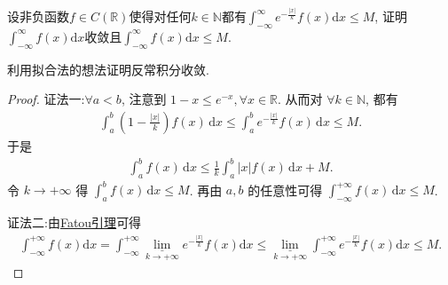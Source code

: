 \documentclass[../../main.tex]{subfiles}
\begin{document}
\begin{example}
设非负函数$f \in C(\mathbb{R})$使得对任何$k \in \mathbb{N}$都有$\int_{-\infty}^{\infty} e^{-\frac{|x|}{k}} f(x) \mathrm{d}x \leqslant M$, 证明$\int_{-\infty}^{\infty} f(x) \mathrm{d}x$收敛且$\int_{-\infty}^{\infty} f(x) \mathrm{d}x \leqslant M$.
\end{example}
\begin{note}
利用拟合法的想法证明反常积分收敛.
\end{note}
\begin{proof}
{\color{blue} 证法一:}$\forall a < b$, 注意到 $1 - x \leqslant e^{-x}, \forall x \in \mathbb{R}$. 从而对 $\forall k \in \mathbb{N}$, 都有
\begin{align*}
\int_a^b \left( 1 - \frac{|x|}{k} \right) f(x) \, \mathrm{d}x \leqslant \int_a^b e^{-\frac{|x|}{k}} f(x) \, \mathrm{d}x \leqslant M.
\end{align*}
于是
\begin{align*}
\int_a^b f(x) \, \mathrm{d}x \leqslant \frac{1}{k} \int_a^b |x| f(x) \, \mathrm{d}x + M.
\end{align*}
令 $k \to +\infty$ 得 $\int_a^b f(x) \, \mathrm{d}x \leqslant M$. 再由 $a, b$ 的任意性可得 $\int_{-\infty}^{+\infty} f(x) \, \mathrm{d}x \leqslant M$.

{\color{blue} 证法二:}由\hyperref[Real Analysis-lemma:Fatou引理]{Fatou引理}可得
\begin{align*}
\int_{-\infty}^{+\infty}{f\left( x \right) \mathrm{d}x}=\int_{-\infty}^{+\infty}{\underset{k\rightarrow +\infty}{\underline{\lim }}e^{-\frac{\left| x \right|}{k}}f\left( x \right) \mathrm{d}x}\leqslant \underset{k\rightarrow +\infty}{\underline{\lim }}\int_{-\infty}^{+\infty}{e^{-\frac{\left| x \right|}{k}}f\left( x \right) \mathrm{d}x}\leqslant M.
\end{align*}
\end{proof}
\end{document}
